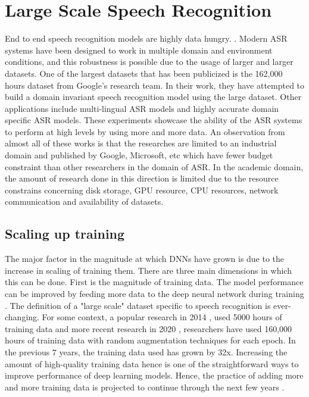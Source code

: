 \chapter{Large Scale Speech Recognition}
\label{chapter:largescale}

End to end speech recognition models are highly data hungry. \cite{Li2020OnRecognition}. Modern ASR systems have been designed to work in multiple domain and environment conditions, and this robustness is possible due to the usage of larger and larger datasets. One of the largest datasets that has been publicized is the 162,000 hours dataset from Google's research team. In their work, they have attempted to build a domain invariant speech recognition model using the large dataset\cite{Narayanan2019TowardTraining}. Other applications include multi-lingual ASR models \cite{Kannan2019Large-ScaleModel} and highly accurate domain specific ASR models. These experiments showcase the ability of the ASR systems to perform at high levels by using more and more data. An observation from almost all of these works is that the researches are limited to an industrial domain and published by Google, Microsoft, etc which have fewer budget constraint than other researchers in the domain of ASR. In the academic domain, the amount of research done in this direction is limited due to the resource constrains concerning disk storage, GPU resource, CPU resources, network communication and availability of datasets. 

\section{Scaling up training}
The major factor in the magnitude at which DNNs have grown is due to the increase in scaling of training them. There are three main dimensions in which this can be done. First is the magnitude of training data. The model performance can be improved by feeding more data to the deep neural network during training \cite{HestnessDEEPEMPIRICALLY}. The definition of a "large scale" dataset specific to speech recognition is ever-changing. For some context, a popular research in 2014 \cite{Hannun2014DeepRecognition}, used 5000 hours of training data and more recent research in 2020 \cite{Li2020OnRecognition}, researchers have used 160,000 hours of training data with random augmentation techniques for each epoch. In the previous 7 years, the training data used has grown by 32x. Increasing the amount of high-quality training data hence is one of the straightforward ways to improve performance of deep learning models. Hence, the practice of adding more and more training data is projected to continue through the next few years \cite{Mayer2020ScalableInfrastructures}. 


